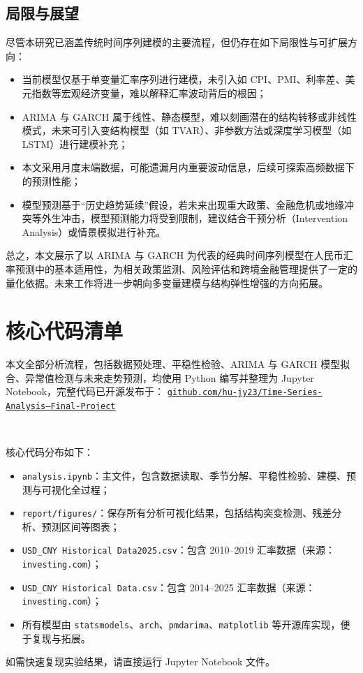 \documentclass[11pt,a4paper]{article}
\begin{document}
\subsection{局限与展望}

尽管本研究已涵盖传统时间序列建模的主要流程，但仍存在如下局限性与可扩展方向：

\begin{itemize}
  \item 当前模型仅基于单变量汇率序列进行建模，未引入如 CPI、PMI、利率差、美元指数等宏观经济变量，难以解释汇率波动背后的根因；
  \item ARIMA 与 GARCH 属于线性、静态模型，难以刻画潜在的结构转移或非线性模式，未来可引入变结构模型（如 TVAR）、非参数方法或深度学习模型（如 LSTM）进行建模补充；
  \item 本文采用月度末端数据，可能遗漏月内重要波动信息，后续可探索高频数据下的预测性能；
  \item 模型预测基于“历史趋势延续”假设，若未来出现重大政策、金融危机或地缘冲突等外生冲击，模型预测能力将受到限制，建议结合干预分析（Intervention Analysis）或情景模拟进行补充。
\end{itemize}

总之，本文展示了以 ARIMA 与 GARCH 为代表的经典时间序列模型在人民币汇率预测中的基本适用性，为相关政策监测、风险评估和跨境金融管理提供了一定的量化依据。未来工作将进一步朝向多变量建模与结构弹性增强的方向拓展。

\appendix
\section{核心代码清单}

本文全部分析流程，包括数据预处理、平稳性检验、ARIMA 与 GARCH 模型拟合、异常值检测与未来走势预测，均使用 Python 编写并整理为 Jupyter Notebook，完整代码已开源发布于：
  \href{https://github.com/hu-jy23/Time-Series-Analysis---Final-Project}{\texttt{github.com/hu-jy23/Time-Series-Analysis---Final-Project}}


  \ 


\noindent 核心代码分布如下：

\begin{itemize}
  \item \texttt{analysis.ipynb}：主文件，包含数据读取、季节分解、平稳性检验、建模、预测与可视化全过程；
  \item \texttt{report/figures/}：保存所有分析可视化结果，包括结构突变检测、残差分析、预测区间等图表；
  \item \texttt{USD\_CNY Historical Data2025.csv}：包含 2010--2019 汇率数据（来源：\texttt{investing.com}）；
  \item \texttt{USD\_CNY Historical Data.csv}：包含 2014--2025 汇率数据（来源：\texttt{investing.com}）；
  \item 所有模型由 \texttt{statsmodels}、\texttt{arch}、\texttt{pmdarima}、\texttt{matplotlib} 等开源库实现，便于复现与拓展。
\end{itemize}

如需快速复现实验结果，请直接运行 Jupyter Notebook 文件。

%
\end{document}
